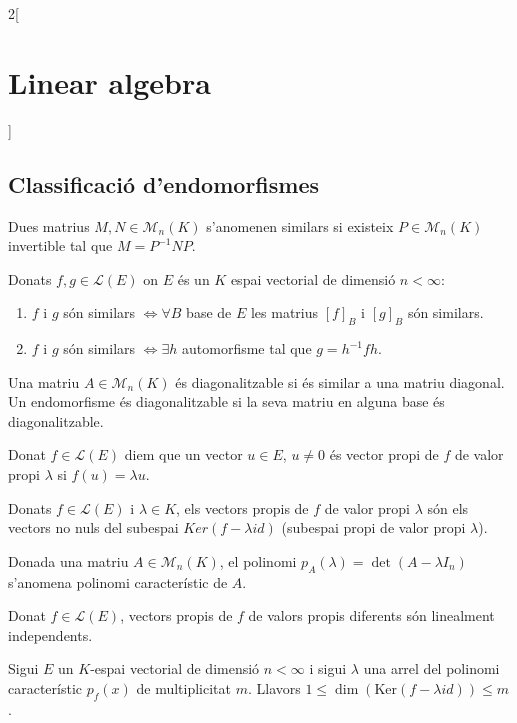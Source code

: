 \documentclass[class=article,10pt,crop=false]{standalone}
\begin{document}
\begin{multicols}{2}[\section{Linear algebra}]
\subsection{Classificació d'endomorfismes}
\begin{definition}
Dues matrius $M,N\in\mathcal{M}_n(K)$ s'anomenen similars si existeix $P\in\mathcal{M}_n(K)$ invertible tal que $M=P^{-1}NP$.
\end{definition}
\begin{prop}
Donats $f,g\in\mathcal{L}(E)$ on $E$ és un $K$ espai vectorial de dimensió $n<\infty$:
\begin{enumerate}
    \item $f$ i $g$ són similars $\iff\forall B$ base de $E$ les matrius $[f]_B$ i $[g]_B$ són similars.
    \item $f$ i $g$ són similars $\iff\exists h$ automorfisme tal que $g=h^{-1}fh$.
\end{enumerate}
\end{prop}
\begin{definition}
Una matriu $A\in\mathcal{M}_n(K)$ és diagonalitzable si és similar a una matriu diagonal. Un endomorfisme és diagonalitzable si la seva matriu en alguna base és diagonalitzable.
\end{definition}
\begin{definition}
Donat $f\in\mathcal{L}(E)$ diem que un vector $u\in E$, $u\ne 0$ és vector propi de $f$ de valor propi $\lambda$ si $f(u)=\lambda u$.
\end{definition}
\begin{lemma}
Donats $f\in\mathcal{L}(E)$ i $\lambda\in K$, els vectors propis de $f$ de valor propi $\lambda$ són els vectors no nuls del subespai $Ker(f-\lambda id)$ (subespai propi de valor propi $\lambda$).
\end{lemma}
\begin{definition}
Donada una matriu $A\in\mathcal{M}_n(K)$, el polinomi $p_A(\lambda)=\det(A-\lambda I_n)$ s'anomena polinomi característic de $A$.
\end{definition}
\begin{prop}
Donat $f\in\mathcal{L}(E)$, vectors propis de $f$ de valors propis diferents són linealment independents.
\end{prop}
\begin{prop}
Sigui $E$ un $K$-espai vectorial de dimensió $n<\infty$ i sigui $\lambda$ una arrel del polinomi característic $p_f(x)$ de multiplicitat $m$. Llavors $1\leq \dim(\text{Ker}(f-\lambda id))\leq m$.
\end{prop}

\end{multicols}
\end{document}
